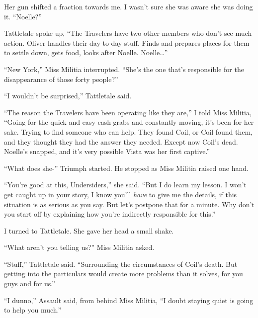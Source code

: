 Her gun shifted a fraction towards me.  I wasn't sure she was aware she was doing it. ``Noelle?''



Tattletale spoke up, ``The Travelers have two other members who don't see much action.  Oliver handles their day-to-day stuff.  Finds and prepares places for them to settle down, gets food, looks after Noelle.  Noelle\ldots''



``New York,'' Miss Militia interrupted.  ``She's the one that's responsible for the disappearance of those forty people?''



``I wouldn't be surprised,'' Tattletale said.



``The reason the Travelers have been operating like they are,'' I told Miss Militia, ``Going for the quick and easy cash grabs and constantly moving, it's been for her sake.  Trying to find someone who can help.  They found Coil, or Coil found them, and they thought they had the answer they needed.  Except now Coil's dead.  Noelle's snapped, and it's very possible Vista was her first captive.''



``What does she-'' Triumph started.  He stopped as Miss Militia raised one hand.



``You're good at this, Undersiders,'' she said.  ``But I do learn my lesson.  I won't get caught up in your story, I know you'll \emph{have} to give me the details, if this situation is as serious as you say.  But let's postpone that for a minute.  Why don't you start off by explaining how you're indirectly responsible for this.''



I turned to Tattletale.  She gave her head a small shake.



``What aren't you telling us?''  Miss Militia asked.



``Stuff,'' Tattletale said.  ``Surrounding the circumstances of Coil's death.  But getting into the particulars would create more problems than it solves, for you guys and for us.''



``I dunno,'' Assault said, from behind Miss Militia, ``I doubt staying quiet is going to help you much.''



